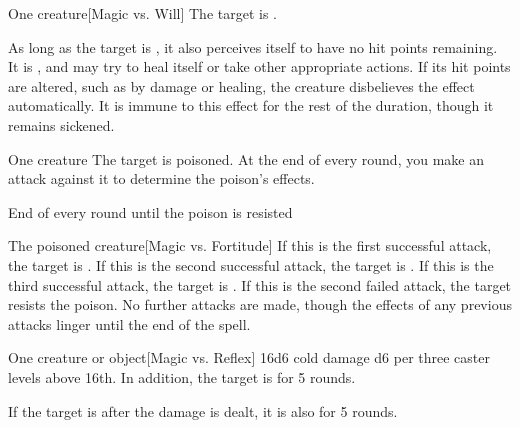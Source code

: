 \spellrng{\rngmed}
\spelldur{\durshort}
\begin{spelltarget}{One creature}[Magic vs. Will]
    \spellsuccess The target is \sickened.

    As long as the target is \bloodied, it also perceives itself to have no hit points remaining. It is \staggered, and may try to heal itself or take other appropriate actions. If its hit points are altered, such as by damage or healing, the creature disbelieves the effect automatically. It is immune to this effect for the rest of the duration, though it remains sickened.
\end{spelltarget}

\spellrng{\rngclose}
\begin{spelltarget}{One creature}
    \spelleffect The target is poisoned. At the end of every round, you make an attack against it to determine the poison's effects.
\end{spelltarget}
\begin{spelltrigger}{End of every round until the poison is resisted}
    \begin{spelltarget}{The poisoned creature}[Magic vs. Fortitude]
        \spellsuccess If this is the first successful attack, the target is \sickened. If this is the second successful attack, the target is \staggered. If this is the third successful attack, the target is \paralyzed.
        \spellfailure If this is the second failed attack, the target resists the poison. No further attacks are made, though the effects of any previous attacks linger until the end of the spell.
    \end{spelltarget}
\end{spelltrigger}

\spellrng{\rngclose}
\begin{spelltarget}{One creature or object}[Magic vs. Reflex]
    \spellsuccess 16d6 cold damage \add d6 per three caster levels above 16th. In addition, the target is \slowed for 5 rounds.

    If the target is \bloodied after the damage is dealt, it is also \paralyzed for 5 rounds.
\end{spelltarget}

